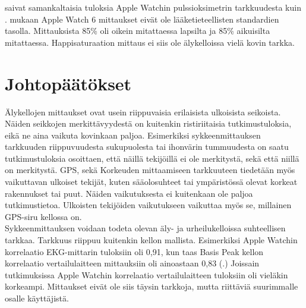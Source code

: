 \documentclass[utf8,bachelor,finnish]{bachelor}
\begin{document}
  \cite{patz_accuracy_2023} saivat samankaltaisia tuloksia Apple Watchin pulssioksimetrin tarkkuudesta kuin \cite{pipek_comparison_2021}.
   \cite{patz_accuracy_2023} mukaan Apple Watch 6 mittaukset eivät ole lääketieteellisten standardien tasolla. Mittauksista 85\%
   oli oikein mitattaessa lapsilta ja 85\% aikuisilta mitattaessa. Happisaturaation mittaus ei siis ole älykelloissa vielä kovin tarkka.
      
    
  
  
\chapter{Johtopäätökset}

Älykellojen mittaukset ovat usein riippuvaisia erilaisista ulkoisista seikoista. Näiden seikkojen merkittävyydestä on kuitenkin ristiriitaisia tutkimustuloksia,
 eikä ne aina vaikuta kovinkaan paljoa. Esimerkiksi sykkeenmittauksen tarkkuuden riippuvuudesta sukupuolesta tai ihonvärin tummuudesta on saatu tutkimustuloksia
  osoittaen, että näillä tekijöillä ei ole merkitystä, sekä että niillä on merkitystä. GPS, sekä Korkeuden mittaamiseen tarkkuuteen tiedetään myös vaikuttavan
   ulkoiset tekijät, kuten sääolosuhteet tai ympäristössä olevat korkeat rakennukset tai puut. Näiden vaikutuksesta ei kuitenkaan ole paljoa tutkimustietoa.
    Ulkoisten tekijöiden vaikutukseen vaikuttaa myös se, millainen GPS-siru kellossa on.\\

Sykkeenmittauksen voidaan todeta olevan äly- ja urheilukelloissa suhteellisen tarkkaa. Tarkkuus riippuu kuitenkin kellon mallista.
 Esimerkiksi Apple Watchin korrelaatio EKG-mittarin tuloksiin oli 0,91, kun taas Basis Peak kellon korrelaatio vertailulaitteen mittauksiin
  oli ainoastaan 0,83 (\cite{wang_accuracy_2017}.) Joissain tutkimuksissa Apple Watchin korrelaatio vertailulaitteen tuloksiin oli vieläkin korkeampi.
   Mittaukset eivät ole siis täysin tarkkoja, mutta riittäviä suurimmalle osalle käyttäjistä.\\
\end{document}
